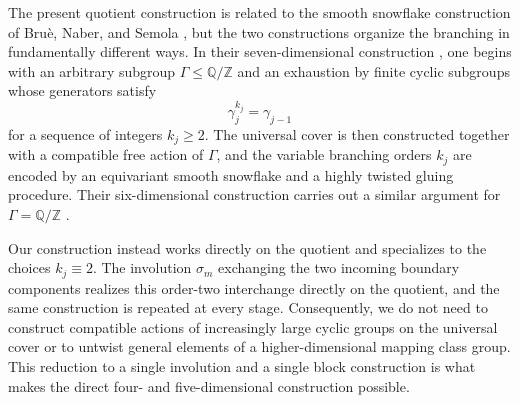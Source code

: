\documentclass[11pt,reqno]{amsart}
\theoremstyle{definition}
\numberwithin{equation}{section}
\begin{document}
The present quotient construction is related to the smooth
snowflake construction of Bru\`e, Naber, and Semola
\cite{BNS7,BNS6}, but the two
constructions organize the branching in fundamentally different ways.
In their seven-dimensional construction \cite{BNS7}, one begins with an arbitrary
subgroup $\Gamma\le\mathbb Q/\mathbb Z$ and an exhaustion by finite
cyclic subgroups whose generators satisfy
\[
 \gamma_j^{k_j}=\gamma_{j-1}
\]
for a sequence of integers $k_j\ge2$.  The universal cover is then
constructed together with a compatible free action of $\Gamma$, and
the variable branching orders $k_j$ are encoded by an equivariant smooth
snowflake and a highly twisted gluing procedure.  Their six-dimensional
construction carries out a similar argument for
$\Gamma=\mathbb Q/\mathbb Z$ \cite{BNS6}.

Our construction instead works directly on the quotient and specializes
to the choices $k_j\equiv2$.  The involution $\sigma_m$ exchanging
the two incoming boundary components realizes this order-two interchange
directly on the quotient, and the same construction is
repeated at
every stage.  Consequently, we do not need to construct compatible
actions of increasingly large cyclic groups on the universal cover or
to untwist general elements of a higher-dimensional mapping class group.
This reduction to a single involution and a single block construction is
what makes the direct four- and five-dimensional construction possible.
\end{document}

